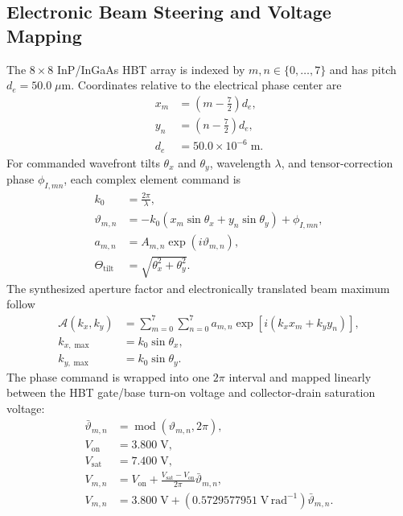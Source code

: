 \documentclass[10pt,twocolumn]{IEEEtran}
\begin{document}
\subsection{Electronic Beam Steering and Voltage Mapping}

The $8\times8$ InP/InGaAs HBT array is indexed by $m,n\in\{0,\ldots,7\}$ and has pitch $d_e=50.0\;\mu\mathrm{m}$. Coordinates relative to the electrical phase center are
\begin{equation}
\begin{aligned}
x_m&=\left(m-\frac{7}{2}\right)d_e, \\
y_n&=\left(n-\frac{7}{2}\right)d_e, \\
d_e&=50.0\times10^{-6}\;\mathrm{m}.
\end{aligned}
\label{eq:array_coordinates}
\end{equation}
For commanded wavefront tilts $\theta_x$ and $\theta_y$, wavelength $\lambda$, and tensor-correction phase $\phi_{I,mn}$, each complex element command is
\begin{equation}
\begin{aligned}
k_0&=\frac{2\pi}{\lambda}, \\
\vartheta_{m,n}&=-k_0\left(x_m\sin\theta_x+y_n\sin\theta_y\right)
+\phi_{I,mn}, \\
a_{m,n}&=A_{m,n}\exp\!\left(i\vartheta_{m,n}\right), \\
\Theta_{\mathrm{tilt}}&=\sqrt{\theta_x^2+\theta_y^2}.
\end{aligned}
\label{eq:electronic_steering}
\end{equation}
The synthesized aperture factor and electronically translated beam maximum follow
\begin{equation}
\begin{aligned}
\mathcal A(k_x,k_y)&=
\sum_{m=0}^{7}\sum_{n=0}^{7}a_{m,n}
\exp\!\left[i\left(k_xx_m+k_yy_n\right)\right], \\
k_{x,\max}&=k_0\sin\theta_x, \\
k_{y,\max}&=k_0\sin\theta_y.
\end{aligned}
\label{eq:array_factor}
\end{equation}
The phase command is wrapped into one $2\pi$ interval and mapped linearly between the HBT gate/base turn-on voltage and collector-drain saturation voltage:
\begin{equation}
\begin{aligned}
\bar\vartheta_{m,n}&=\operatorname{mod}\!\left(\vartheta_{m,n},2\pi\right), \\
V_{\mathrm{on}}&=3.800\;\mathrm{V}, \\
V_{\mathrm{sat}}&=7.400\;\mathrm{V}, \\
V_{m,n}&=V_{\mathrm{on}}
+\frac{V_{\mathrm{sat}}-V_{\mathrm{on}}}{2\pi}\bar\vartheta_{m,n}, \\
V_{m,n}&=3.800\;\mathrm{V}
+\left(0.5729577951\;\mathrm{V\,rad^{-1}}\right)\bar\vartheta_{m,n}.
\end{aligned}
\label{eq:voltage_phase_map}
\end{equation}
\end{document}

